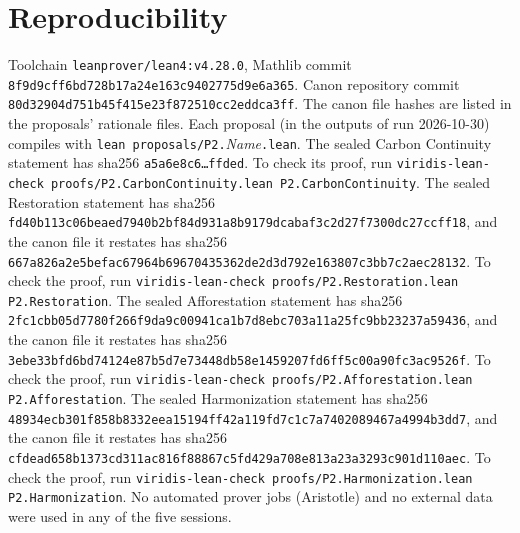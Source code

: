 \documentclass[11pt]{article}
\theoremstyle{definition}
\theoremstyle{remark}
\begin{document}
\section{Reproducibility}
Toolchain \texttt{leanprover/lean4:v4.28.0}, Mathlib commit \texttt{8f9d9cff6bd728b17a24e163c9402775d9e6a365}.
Canon repository commit \texttt{80d32904d751b45f415e23f872510cc2eddca3ff}. The canon file hashes are listed in the proposals' rationale files.
Each proposal (in the outputs of run 2026-10-30) compiles with \texttt{lean proposals/P2.}\textit{Name}\texttt{.lean}.
The sealed Carbon Continuity statement has sha256 \texttt{a5a6e8c6\ldots ffded}. To check its proof, run
\texttt{viridis-lean-check proofs/P2.CarbonContinuity.lean P2.CarbonContinuity}.
The sealed Restoration statement has sha256 \texttt{fd40b113c06beaed7940b2bf84d931a8b9179dcabaf3c2d27f7300dc27ccff18},
and the canon file it restates has sha256 \texttt{667a826a2e5befac67964b69670435362de2d3d792e163807c3bb7c2aec28132}.
To check the proof, run \texttt{viridis-lean-check proofs/P2.Restoration.lean P2.Restoration}.
The sealed Afforestation statement has sha256 \texttt{2fc1cbb05d7780f266f9da9c00941ca1b7d8ebc703a11a25fc9bb23237a59436},
and the canon file it restates has sha256 \texttt{3ebe33bfd6bd74124e87b5d7e73448db58e1459207fd6ff5c00a90fc3ac9526f}.
To check the proof, run \texttt{viridis-lean-check proofs/P2.Afforestation.lean P2.Afforestation}.
The sealed Harmonization statement has sha256 \texttt{48934ecb301f858b8332eea15194ff42a119fd7c1c7a7402089467a4994b3dd7},
and the canon file it restates has sha256 \texttt{cfdead658b1373cd311ac816f88867c5fd429a708e813a23a3293c901d110aec}.
To check the proof, run \texttt{viridis-lean-check proofs/P2.Harmonization.lean P2.Harmonization}.
No automated prover jobs (Aristotle) and no external data were used in any of the five sessions.
\end{document}
